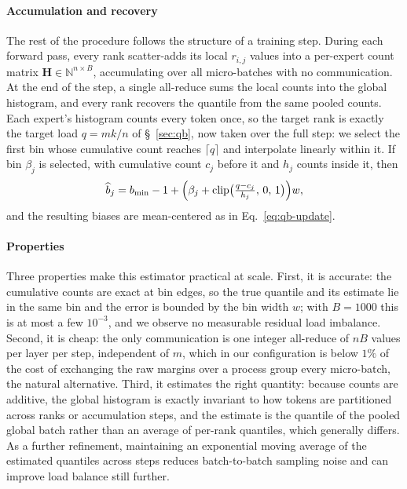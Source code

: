 \paragraph{Accumulation and recovery}
The rest of the procedure follows the structure of a training step.
During each forward pass, every rank scatter-adds its local $r_{i,j}$ values into a per-expert count matrix $\mathbf{H}\in\mathbb{N}^{n\times B}$, accumulating over all micro-batches with no communication.
At the end of the step, a single all-reduce sums the local counts into the global histogram, and every rank recovers the quantile from the same pooled counts.
Each expert's histogram counts every token once, so the target rank is exactly the target load $q=mk/n$ of \S~\ref{sec:qb}, now taken over the full step: we select the first bin whose cumulative count reaches $\lceil q\rceil$ and interpolate linearly within it.
If bin $\beta_j$ is selected, with cumulative count $c_j$ before it and $h_j$ counts inside it, then
\begin{equation*}
    \widehat{b}_j
    = b_{\min}-1+\Bigl(\beta_j+\operatorname{clip}\bigl(\tfrac{q-c_j}{h_j},\,0,\,1\bigr)\Bigr)w,
\end{equation*}
and the resulting biases are mean-centered as in Eq.~\ref{eq:qb-update}.

\paragraph{Properties}
Three properties make this estimator practical at scale.
First, it is accurate: the cumulative counts are exact at bin edges, so the true quantile and its estimate lie in the same bin and the error is bounded by the bin width $w$; with $B=1000$ this is at most a few $10^{-3}$, and we observe no measurable residual load imbalance.
Second, it is cheap: the only communication is one integer all-reduce of $nB$ values per layer per step, independent of $m$, which in our configuration is below $1\%$ of the cost of exchanging the raw margins over a process group every micro-batch, the natural alternative.
Third, it estimates the right quantity: because counts are additive, the global histogram is exactly invariant to how tokens are partitioned across ranks or accumulation steps, and the estimate is the quantile of the pooled global batch rather than an average of per-rank quantiles, which generally differs. As a further refinement, maintaining an exponential moving average of the estimated quantiles across steps reduces batch-to-batch sampling noise and can improve load balance still further.



